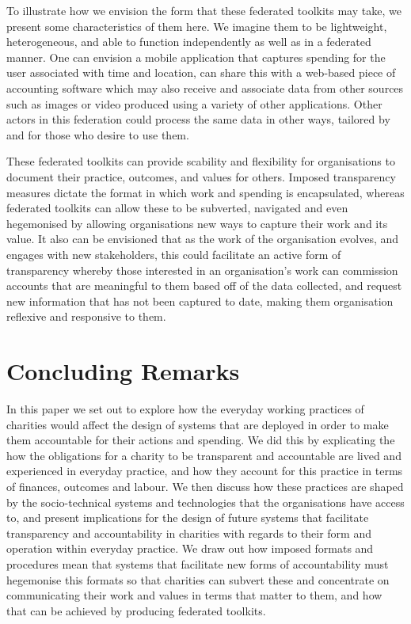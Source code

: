 To illustrate how we envision the form that these federated toolkits may take, we present some characteristics of them here. We imagine them to be lightweight, heterogeneous, and able to function independently as well as in a federated manner. One can envision a mobile application that captures spending for the user associated with time and location, can share this with a web-based piece of accounting software which may also receive and associate data from other sources such as images or video produced using a variety of other applications. Other actors in this federation could process the same data in other ways, tailored by and for those who desire to use them.

These federated toolkits can provide scability and flexibility for organisations to document their practice, outcomes, and values for others. Imposed transparency measures dictate the format in which work and spending is encapsulated, whereas federated toolkits can allow these to be subverted, navigated and even hegemonised by allowing organisations new ways to capture their work and its value. It also can be envisioned that as the work of the organisation evolves, and engages with new stakeholders, this could facilitate an active form of transparency \cite{oliver_what_2004} whereby those interested in an organisation's work can commission accounts that are meaningful to them based off of the data collected, and request new information that has not been captured to date, making them organisation reflexive and responsive to them.

\section{Concluding Remarks}
In this paper we set out to explore how the everyday working practices of charities would affect the design of systems that are deployed in order to make them accountable for their actions and spending. We did this by explicating the how the obligations for a charity to be transparent and accountable are lived and experienced in everyday practice, and how they account for this practice in terms of finances, outcomes and labour. We then discuss how these practices are shaped by the socio-technical systems and technologies that the organisations have access to, and present implications for the design of future systems that facilitate transparency and accountability in charities with regards to their form and operation within everyday practice. We draw out how imposed formats and procedures mean that systems that facilitate new forms of accountability must hegemonise this formats so that charities can subvert these and concentrate on communicating their work and values in terms that matter to them, and how that can be achieved by producing federated toolkits.

